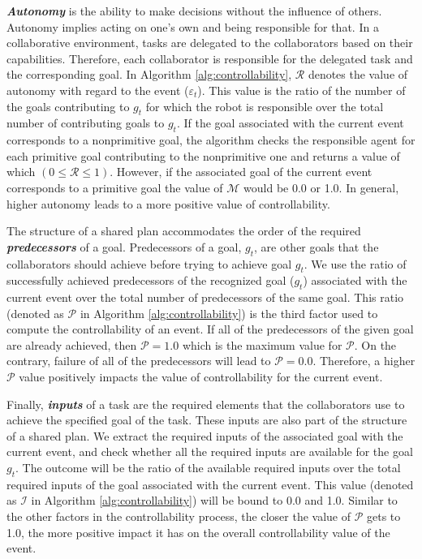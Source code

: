 \documentclass{article}
\begin{document}
\textit{\textbf{Autonomy}} is the ability to make decisions without the
influence of others. Autonomy implies acting on one's own and being responsible
for that. In a collaborative environment, tasks are delegated to the
collaborators based on their capabilities. Therefore, each collaborator is
responsible for the delegated task and the corresponding goal. In Algorithm
\ref{alg:controllability}, $\mathcal{R}$ denotes the value of autonomy with
regard to the event ($\varepsilon_t$). This value is the ratio of the number of
the goals contributing to $\mathit{g}_{t}$ for which the robot is responsible
over the total number of contributing goals to $\mathit{g}_{t}$. If the goal
associated with the current event corresponds to a nonprimitive goal, the
algorithm checks the responsible agent for each primitive goal contributing to
the nonprimitive one and returns a value of which $(0 \leq \mathcal{R} \leq 1)$.
However, if the associated goal of the current event corresponds to a primitive
goal the value of $\mathcal{M}$ would be 0.0 or 1.0. In general, higher autonomy
leads to a more positive value of controllability.

The structure of a shared plan accommodates the order of the required
\textit{\textbf{predecessors}} of a goal. Predecessors of a goal, $g_t$, are
other goals that the collaborators should achieve before trying to achieve goal
$g_t$. We use the ratio of successfully achieved predecessors of the recognized
goal ($\mathit{g}_{t}$) associated with the current event over the total number
of predecessors of the same goal. This ratio (denoted as $\mathcal{P}$ in
Algorithm \ref{alg:controllability}) is the third factor used to compute the
controllability of an event. If all of the predecessors of the given goal are
already achieved, then $\mathcal{P}=1.0$ which is the maximum value for
$\mathcal{P}$. On the contrary, failure of all of the predecessors will lead to
$\mathcal{P}=0.0$. Therefore, a higher $\mathcal{P}$ value positively impacts
the value of controllability for the current event.

Finally, \textit{\textbf{inputs}} of a task are the required elements that the
collaborators use to achieve the specified goal of the task. These inputs are
also part of the structure of a shared plan. We extract the required inputs of
the associated goal with the current event, and check whether all the required
inputs are available for the goal $\mathit{g}_{t}$. The outcome will be the
ratio of the available required inputs over the total required inputs of the
goal associated with the current event. This value (denoted as $\mathcal{I}$ in
Algorithm \ref{alg:controllability}) will be bound to 0.0 and 1.0. Similar to
the other factors in the controllability process, the closer the value of
$\mathcal{P}$ gets to 1.0, the more positive impact it has on the overall
controllability value of the event.
\end{document}
